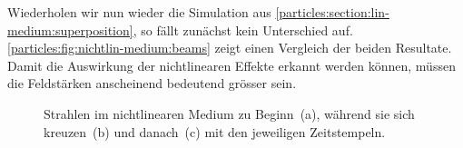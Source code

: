 Wiederholen wir nun wieder die Simulation aus \autoref{particles:section:lin-medium:superposition}, so fällt zunächst kein Unterschied auf.
\autoref{particles:fig:nichtlin-medium:beams} zeigt einen Vergleich der beiden Resultate.
Damit die Auswirkung der nichtlinearen Effekte erkannt werden können, müssen die Feldstärken anscheinend bedeutend grösser sein.
\begin{figure}
    \centering
    \label{particles:fig:nichtlin-medium:beams-1}\hfill
    \label{particles:fig:nichtlin-medium:beams-2}\hfill
    \label{particles:fig:nichtlin-medium:beams-3}
    \caption{Strahlen im nichtlinearen Medium zu Beginn~(a), während sie sich kreuzen~(b) und danach~(c) mit den jeweiligen Zeitstempeln.}\label{particles:fig:nichtlin-medium:beams}
\end{figure}


